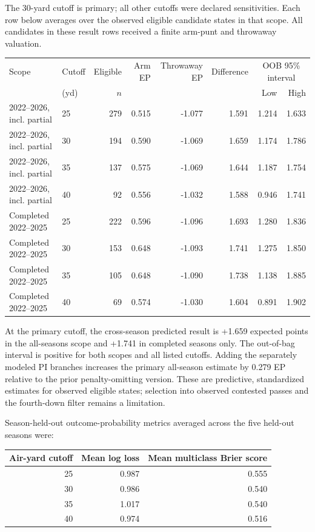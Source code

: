 \documentclass[11pt]{article}
\begin{document}
The 30-yard cutoff is primary; all other cutoffs were declared sensitivities. Each row below averages over the observed eligible candidate states in that scope. All candidates in these result rows received a finite arm-punt and throwaway valuation.

\begin{center}
\small
\begin{tabular}{llrrrrrr}
\toprule
Scope & Cutoff & Eligible & Arm EP & Throwaway EP & Difference & \multicolumn{2}{c}{OOB 95\% interval} \\
 & (yd) & \(n\) & & & & Low & High \\
\midrule
2022--2026, incl. partial & 25 & 279 & 0.515 & -1.077 & 1.591 & 1.214 & 1.633 \\
2022--2026, incl. partial & 30 & 194 & 0.590 & -1.069 & 1.659 & 1.174 & 1.786 \\
2022--2026, incl. partial & 35 & 137 & 0.575 & -1.069 & 1.644 & 1.187 & 1.754 \\
2022--2026, incl. partial & 40 & 92 & 0.556 & -1.032 & 1.588 & 0.946 & 1.741 \\
Completed 2022--2025 & 25 & 222 & 0.596 & -1.096 & 1.693 & 1.280 & 1.836 \\
Completed 2022--2025 & 30 & 153 & 0.648 & -1.093 & 1.741 & 1.275 & 1.850 \\
Completed 2022--2025 & 35 & 105 & 0.648 & -1.090 & 1.738 & 1.138 & 1.885 \\
Completed 2022--2025 & 40 & 69 & 0.574 & -1.030 & 1.604 & 0.891 & 1.902 \\
\bottomrule
\end{tabular}
\end{center}

At the primary cutoff, the cross-season predicted result is +1.659 expected points in the all-seasons scope and +1.741 in completed seasons only. The out-of-bag interval is positive for both scopes and all listed cutoffs. Adding the separately modeled PI branches increases the primary all-season estimate by 0.279 EP relative to the prior penalty-omitting version. These are predictive, standardized estimates for observed eligible states; selection into observed contested passes and the fourth-down filter remains a limitation.

Season-held-out outcome-probability metrics averaged across the five held-out seasons were:
\begin{center}
\begin{tabular}{rrr}
\toprule
Air-yard cutoff & Mean log loss & Mean multiclass Brier score \\
\midrule
25 & 0.987 & 0.555 \\
30 & 0.986 & 0.540 \\
35 & 1.017 & 0.540 \\
40 & 0.974 & 0.516 \\
\bottomrule
\end{tabular}
\end{center}
\end{document}
